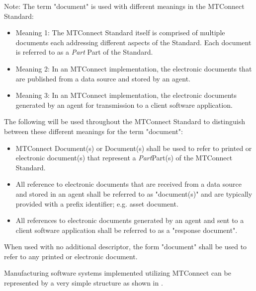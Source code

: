 \documentclass{mtconnect}	%
\providecommand{\DIFadd}[1]{{\hspace{0pt}\protect\color{blue}#1}} %
\providecommand{\DIFdel}[1]{{\hspace{0pt}\protect\color{red}#1}}                      %
\providecommand{\DIFaddbegin}{} %
\providecommand{\DIFaddend}{} %
\providecommand{\DIFdelbegin}{} %
\providecommand{\DIFdelend}{} %
\begin{document}
\begin{note}
Note: The term "document" is used with different meanings in the MTConnect Standard:
\begin{itemize}

\item Meaning 1:  The MTConnect Standard itself is comprised of multiple documents each addressing different aspects of the Standard.  Each document is referred to as a \DIFdelbegin \DIFdel{\textit{Part} }\DIFdelend \DIFaddbegin \DIFadd{Part }\DIFaddend of the Standard.

\item Meaning 2:  In an MTConnect implementation, the electronic documents that are published from a data source and stored by an \gls{agent}.     

\item Meaning 3:  In an MTConnect implementation, the electronic documents generated by an \gls{agent} for transmission to a client software application. 
\end{itemize}

The following will be used throughout the MTConnect Standard to distinguish between these different meanings for the term "document":

\begin{itemize}

\item MTConnect Document(s) or Document(s) shall be used to refer to printed or electronic document(s) that represent a \DIFdelbegin \DIFdel{\textit{Part}}\DIFdelend \DIFaddbegin \DIFadd{Part}\DIFaddend (s) of the MTConnect Standard.  

\item All reference to electronic documents that are received from a data source and stored in an \gls{agent} shall be referred to as "\gls{document}(s)" and are typically provided with a prefix identifier; e.g. \gls{asset document}.

\item All references to electronic documents generated by an \gls{agent} and sent to a client software application shall be referred to as a "\gls{response document}".  
\end{itemize}

When used with no additional descriptor, the form "document" shall be used to refer to any printed or electronic document.
\end{note}

Manufacturing software systems implemented utilizing MTConnect can be represented by a very simple structure as shown in .
\end{document}
